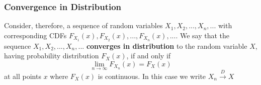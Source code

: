 \documentclass[notes=show,smaller,handout]{beamer}\usepackage[]{graphicx}\usepackage[]{color}
\begin{document}
\begin{frame}%

\frametitle{Convergence in Distribution}

\begin{definition}
Consider, therefore, a sequence of random variables $X_{1},X_{2},...,X_{n},...$ with corresponding CDFs $F_{X_{1}}\left( x\right) ,F_{X_{2}}\left( x\right),...,F_{X_{n}}\left(x\right) ,...$. We say that the sequence $X_{1},X_{2},...,X_{n},...$ \textbf{converges in distribution} to the random variable $X$, having probability distribution $F_X(x)$, if and only if
\begin{equation*}
\lim_{n\rightarrow \infty }F_{X_n}\left( x\right) =F_{X}\left( x\right)
\end{equation*}
at all points $x$ where $F_{X}\left( x\right) $ is continuous. In this case we write $X_{n}\overset{D}{\rightarrow }X$
\end{definition}
\end{frame}%
\end{document}
